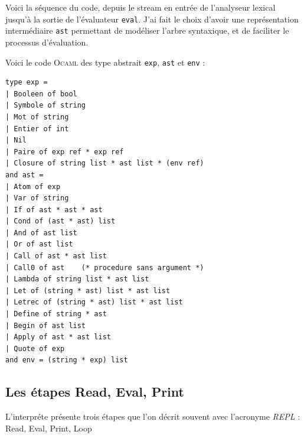 Voici la séquence du code, depuis le stream en entrée de l'analyseur lexical jusqu'à la sortie de l'évaluateur \texttt{eval}.
J'ai fait le choix d'avoir une représentation intermédiaire \texttt{ast} permettant de modéliser l'arbre syntaxique, et de faciliter
le processus d'évaluation.
\begin{center}
\end{center}


Voici le code \textsc{Ocaml} des type abstrait \verb+exp+, \verb+ast+ et \verb+env+ :

\begin{verbatim}
type exp =
| Booleen of bool
| Symbole of string
| Mot of string
| Entier of int
| Nil
| Paire of exp ref * exp ref
| Closure of string list * ast list * (env ref)
and ast =
| Atom of exp
| Var of string
| If of ast * ast * ast
| Cond of (ast * ast) list
| And of ast list
| Or of ast list
| Call of ast * ast list
| Call0 of ast    (* procedure sans argument *)
| Lambda of string list * ast list   
| Let of (string * ast) list * ast list
| Letrec of (string * ast) list * ast list
| Define of string * ast
| Begin of ast list
| Apply of ast * ast list
| Quote of exp
and env = (string * exp) list
\end{verbatim}


\subsection{Les étapes Read, Eval, Print}
L'interpr\'{e}te pr\'{e}sente trois \'{e}tapes que l'on d\'{e}crit souvent avec l'acronyme \textit{REPL} :
Read, Eval, Print, Loop


